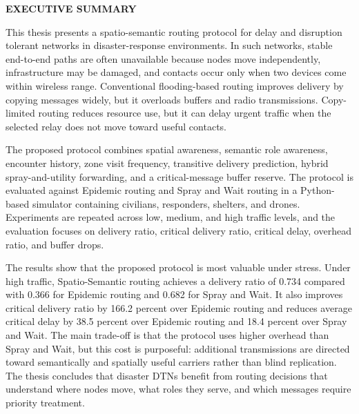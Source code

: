 \begin{center}
	\Large{\textbf{EXECUTIVE SUMMARY}}	
\end{center}
\vspace{1em}
\normalsize
\hspace{1cm} This thesis presents a spatio-semantic routing protocol for delay and disruption tolerant networks in disaster-response environments. In such networks, stable end-to-end paths are often unavailable because nodes move independently, infrastructure may be damaged, and contacts occur only when two devices come within wireless range. Conventional flooding-based routing improves delivery by copying messages widely, but it overloads buffers and radio transmissions. Copy-limited routing reduces resource use, but it can delay urgent traffic when the selected relay does not move toward useful contacts.

The proposed protocol combines spatial awareness, semantic role awareness, encounter history, zone visit frequency, transitive delivery prediction, hybrid spray-and-utility forwarding, and a critical-message buffer reserve. The protocol is evaluated against Epidemic routing and Spray and Wait routing in a Python-based simulator containing civilians, responders, shelters, and drones. Experiments are repeated across low, medium, and high traffic levels, and the evaluation focuses on delivery ratio, critical delivery ratio, critical delay, overhead ratio, and buffer drops.

The results show that the proposed protocol is most valuable under stress. Under high traffic, Spatio-Semantic routing achieves a delivery ratio of 0.734 compared with 0.366 for Epidemic routing and 0.682 for Spray and Wait. It also improves critical delivery ratio by 166.2 percent over Epidemic routing and reduces average critical delay by 38.5 percent over Epidemic routing and 18.4 percent over Spray and Wait. The main trade-off is that the protocol uses higher overhead than Spray and Wait, but this cost is purposeful: additional transmissions are directed toward semantically and spatially useful carriers rather than blind replication. The thesis concludes that disaster DTNs benefit from routing decisions that understand where nodes move, what roles they serve, and which messages require priority treatment.
